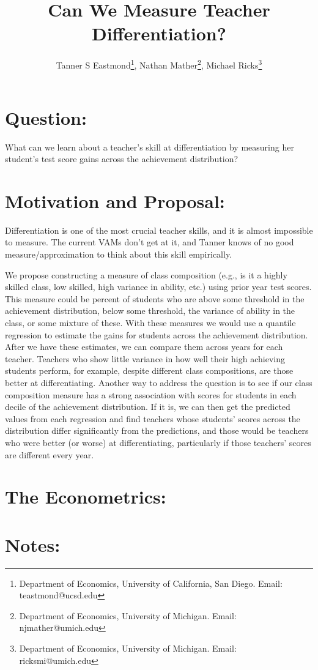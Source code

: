 \documentclass[letterpaper,12pt]{article}
\title{Can We Measure Teacher Differentiation? }
\author{Tanner S Eastmond\thanks{Department of Economics, University of California, San Diego. Email: teastmond@ucsd.edu},  Nathan Mather\thanks{Department of Economics, University of Michigan. Email: njmather@umich.edu }, Michael Ricks\thanks{Department of Economics, University of Michigan. Email: ricksmi@umich.edu}}
\date{\vspace{-8ex}}
\begin{document}
\maketitle


\section{Question:}
What can we learn about a teacher’s skill at differentiation by measuring her student’s test score gains across the achievement distribution?

\section{Motivation and Proposal:}
Differentiation is one of the most crucial teacher skills, and it is almost impossible to measure. The current VAMs don't get at it, and Tanner knows of no good measure/approximation to think about this skill empirically.

We propose constructing a measure of class composition (e.g., is it a highly skilled class, low skilled, high variance in ability, etc.) using prior year test scores. This measure could be percent of students who are above some threshold in the achievement distribution, below some threshold, the variance of ability in the class, or some mixture of these. With these measures we would use a quantile regression to estimate the gains for students across the achievement distribution. After we have these estimates, we can compare them across years for each teacher. Teachers who show little variance in how well their high achieving students perform, for example, despite different class compositions, are those better at differentiating. Another way to address the question is to see if our class composition measure has a strong association with scores for students in each decile of the achievement distribution. If it is, we can then get the predicted values from each regression and find teachers whose students’ scores across the distribution differ significantly from the predictions, and those would be teachers who were better (or worse) at differentiating, particularly if those teachers’ scores are different every year.

\section{The Econometrics:}



\section{Notes:}
\end{document}

